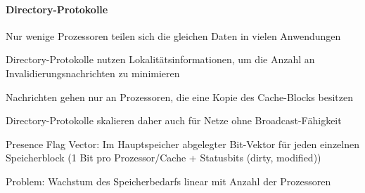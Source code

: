 \documentclass[10pt,landscape]{article}
\begin{document}
\begin{multicols}{3}
  \paragraph{Directory-Protokolle}
  \begin{itemize*}
    \item Nur wenige Prozessoren teilen sich die gleichen Daten in vielen Anwendungen
    \item Directory-Protokolle nutzen Lokalitätsinformationen, um die Anzahl an Invalidierungsnachrichten zu minimieren
    \item Nachrichten gehen nur an Prozessoren, die eine Kopie des Cache-Blocks besitzen
    \item Directory-Protokolle skalieren daher auch für Netze ohne Broadcast-Fähigkeit
    \item Presence Flag Vector: Im Hauptspeicher abgelegter Bit-Vektor für jeden einzelnen Speicherblock (1 Bit pro Prozessor/Cache + Statusbits (dirty, modified))
    \item Problem: Wachstum des Speicherbedarfs linear mit Anzahl der Prozessoren
  \end{itemize*}
  
\end{multicols}
\end{document}
